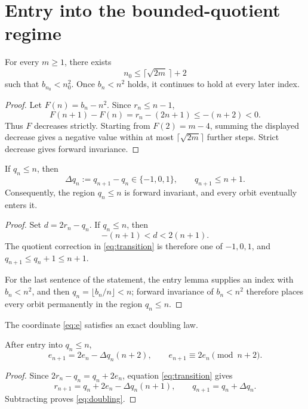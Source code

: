 \section{Entry into the bounded-quotient regime}

\begin{lemma}[Entry]
For every $m\ge1$, there exists
\[
 n_0\le \lceil\sqrt{2m}\,\rceil+2
\]
such that $b_{n_0}<n_0^2$. Once $b_n<n^2$ holds, it continues to hold at every later index.
\end{lemma}

\begin{proof}
Let $F(n)=b_n-n^2$. Since $r_n\le n-1$,
\[
 F(n+1)-F(n)=r_n-(2n+1)\le-(n+2)<0.
\]
Thus $F$ decreases strictly. Starting from $F(2)=m-4$, summing the displayed decrease gives a negative value within at most $\lceil\sqrt{2m}\rceil$ further steps. Strict decrease gives forward invariance.
\end{proof}

\begin{lemma}
If $q_n\le n$, then
\[
 \Delta q_n:=q_{n+1}-q_n\in\{-1,0,1\},
 \qquad q_{n+1}\le n+1.
\]
Consequently, the region $q_n\le n$ is forward invariant, and every orbit eventually enters it.
\end{lemma}

\begin{proof}
Set $d=2r_n-q_n$. If $q_n\le n$, then
\[
 -(n+1)<d<2(n+1).
\]
The quotient correction in \eqref{eq:transition} is therefore one of $-1,0,1$, and $q_{n+1}\le q_n+1\le n+1$.

For the last sentence of the statement, the entry lemma supplies an index with $b_n<n^2$, and then $q_n=\lfloor b_n/n\rfloor<n$; forward invariance of $b_n<n^2$ therefore places every orbit permanently in the region $q_n\le n$.
\end{proof}

The coordinate \eqref{eq:e} satisfies an exact doubling law.

\begin{proposition}
After entry into $q_n\le n$,
\begin{equation}
 e_{n+1}=2e_n-\Delta q_n(n+2),
 \qquad
 e_{n+1}\equiv2e_n\pmod{n+2}.
 \label{eq:doubling}
\end{equation}
\end{proposition}

\begin{proof}
Since $2r_n-q_n=q_n+2e_n$, equation \eqref{eq:transition} gives
\[
 r_{n+1}=q_n+2e_n-\Delta q_n(n+1),
 \qquad q_{n+1}=q_n+\Delta q_n.
\]
Subtracting proves \eqref{eq:doubling}.
\end{proof}
